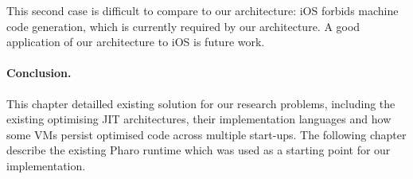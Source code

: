 \documentclass[a4paper,12pt,twoside]{../includes/ThesisStyle}
\begin{document}
This second case is difficult to compare to our architecture: iOS forbids machine code generation, which is currently required by our architecture. A good application of our architecture to iOS is future work.








\paragraph{Conclusion.} This chapter detailled existing solution for our research problems, including the existing optimising JIT architectures, their implementation languages and how some VMs persist optimised code across multiple start-ups. The following chapter describe the existing Pharo runtime which was used as a starting point for our implementation.




\end{document}
